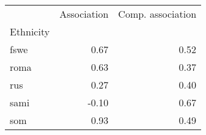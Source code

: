 \begin{tabular}{lrr}
\toprule
{} &  Association &  Comp. association \\
Ethnicity &              &                    \\
\midrule
fswe      &         0.67 &               0.52 \\
roma      &         0.63 &               0.37 \\
rus       &         0.27 &               0.40 \\
sami      &        -0.10 &               0.67 \\
som       &         0.93 &               0.49 \\
\bottomrule
\end{tabular}
